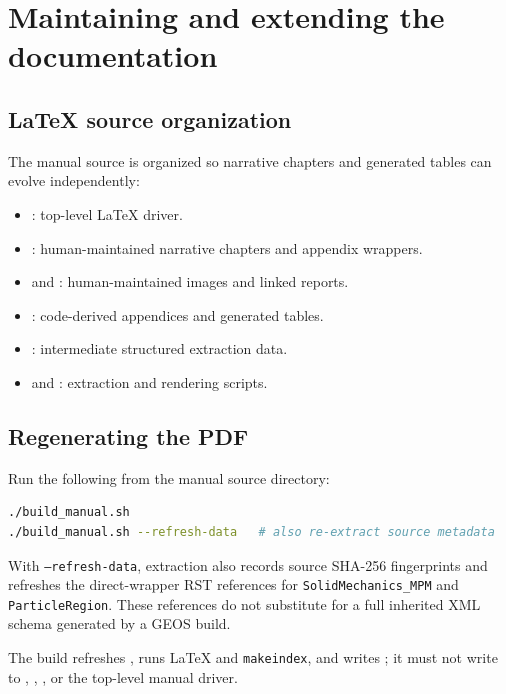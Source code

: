 \chapter{Maintaining and extending the documentation}
\label{ch:maintaining}

\section{LaTeX source organization}
The manual source is organized so narrative chapters and generated tables can evolve independently:
\begin{itemize}[leftmargin=*]
\item {}: top-level LaTeX driver.
\item {}: human-maintained narrative chapters and appendix wrappers.
\item {} and : human-maintained images and linked reports.
\item {}: code-derived appendices and generated tables.
\item {}: intermediate structured extraction data.
\item {} and : extraction and rendering scripts.
\end{itemize}

\section{Regenerating the PDF}
Run the following from the manual source directory:
\begin{lstlisting}[language=bash,caption={Manual build commands.}]
./build_manual.sh
./build_manual.sh --refresh-data   # also re-extract source metadata
\end{lstlisting}
With \texttt{--refresh-data}, extraction also records source SHA-256 fingerprints and refreshes the direct-wrapper RST references for \texttt{SolidMechanics\_MPM} and \texttt{ParticleRegion}. These references do not substitute for a full inherited XML schema generated by a GEOS build.

The build refreshes , runs \LaTeX{} and \texttt{makeindex}, and writes ; it must not write to , , , or the top-level manual driver.

